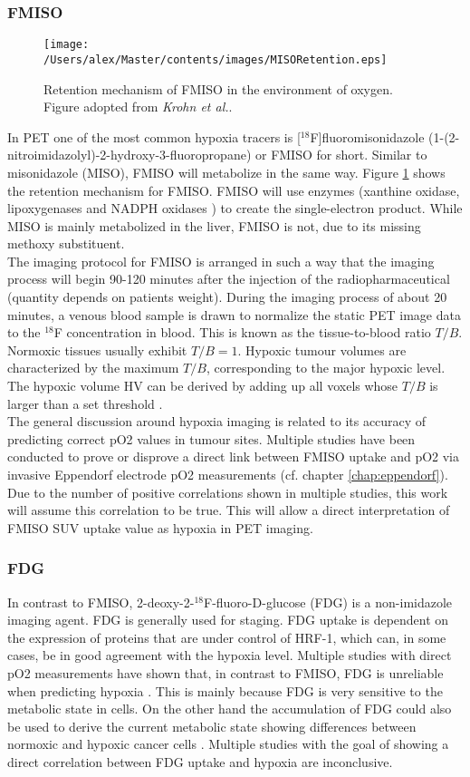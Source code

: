 \subsubsection{FMISO}
\begin{figure}[hb]
\centering
\texttt{[image: /Users/alex/Master/contents/images/MISORetention.eps]}
\vspace{1cm}
\caption{Retention mechanism of FMISO in the environment of oxygen. Figure adopted from \textit{Krohn et al.}\cite{pmid18523070}.}
\label{fig:MISORetention}
\end{figure}
In PET one of the most common hypoxia tracers is [$^{18}$F]fluoromisonidazole (1-(2-nitroimidazolyl)-2-hydroxy-3-fluoropropane) or FMISO for short. Similar to misonidazole (MISO), FMISO will metabolize in the same way. Figure \ref{fig:MISORetention} shows the retention mechanism for FMISO. FMISO will use enzymes (xanthine oxidase, lipoxygenases and NADPH oxidases \cite{pmid18523070}) to create the single-electron product. While MISO is mainly metabolized in the liver, FMISO is not, due to its missing methoxy substituent.\\The imaging protocol for FMISO is arranged in such a way that the imaging process will begin 90-120 minutes after the injection of the radiopharmaceutical (quantity depends on patients weight). During the imaging process of about 20 minutes, a venous blood sample is drawn to normalize the static PET image data to the $^{18}$F concentration in blood. This is known as the tissue-to-blood ratio $T/B$. Normoxic tissues usually exhibit $T/B = 1$. Hypoxic tumour volumes are characterized by the maximum $T/B$, corresponding to the major hypoxic level. The hypoxic volume HV can be derived by adding up all voxels whose $T/B$ is larger than a set threshold \cite{pmid18523070}.\\The general discussion around hypoxia imaging is related to its accuracy of predicting correct pO2 values in tumour sites. Multiple studies have been conducted to prove or disprove a direct link between FMISO uptake and pO2 via invasive Eppendorf electrode pO2 measurements (cf. chapter \ref{chap:eppendorf}). Due to the number of positive correlations shown in multiple studies, this work will assume this correlation to be true. This will allow a direct interpretation of FMISO SUV uptake value as hypoxia in PET imaging.
\subsubsection{FDG}
In contrast to FMISO, 2-deoxy-2-$^{18}$F-fluoro-D-glucose (FDG) is a non-imidazole imaging agent. FDG is generally used for staging. FDG uptake is dependent on the expression of proteins that are under control of HRF-1, which can, in some cases, be in good agreement with the hypoxia level. Multiple studies with direct pO2 measurements have shown that, in contrast to FMISO, FDG is unreliable when predicting hypoxia \cite{pmid18682937}. This is mainly because FDG is very sensitive to the metabolic state in cells. On the other hand the accumulation of FDG could also be used to derive the current metabolic state showing differences between normoxic and hypoxic cancer cells \cite{pmid17400370}. Multiple studies with the goal of showing a direct correlation between FDG uptake and hypoxia are inconclusive.
